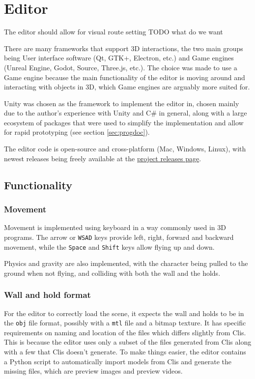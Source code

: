 \chapter{Editor}\label{sec:editor}
The editor should allow for visual route setting TODO what do we want

There are many frameworks that support 3D interactions, the two main groups being User interface software (Qt, GTK+, Electron, etc.) and Game engines (Unreal Engine, Godot, Source, Three.js, etc.).
The choice was made to use a Game engine because the main functionality of the editor is moving around and interacting with objects in 3D, which Game engines are arguably more suited for.

Unity was chosen as the framework to implement the editor in, chosen mainly due to the author's experience with Unity and C\# in general, along with a large ecosystem of packages that were used to simplify the implementation and allow for rapid prototyping (see section \ref{sec:progdoc}).

The editor code is open-source and cross-platform (Mac, Windows, Linux), with newest releases being freely available at the \href{https://github.com/Climber-Tools/Cled/releases}{project releases page}.

\section{Functionality}

\subsection{Movement}
Movement is implemented using keyboard in a way commonly used in 3D programs.
The arrow or \verb|WSAD| keys provide left, right, forward and backward movement, while the \verb|Space| and \verb|Shift| keys allow flying up and down.

Physics and gravity are also implemented, with the character being pulled to the ground when not flying, and colliding with both the wall and the holds.

\subsection{Wall and hold format}
For the editor to correctly load the scene, it expects the wall and holds to be in the \verb|obj| file format, possibly with a \verb|mtl| file and a bitmap texture.
It has specific requirements on naming and location of the files which differs slightly from Clis.
This is because the editor uses only a subset of the files generated from Clis along with a few that Clis doesn't generate.
To make things easier, the editor contains a Python script to automatically import models from Clis and generate the missing files, which are preview images and preview videos.

